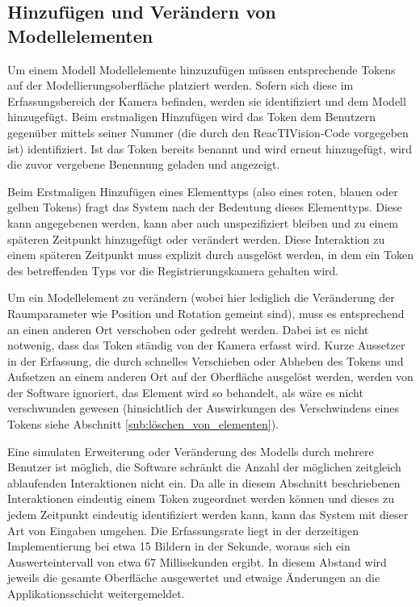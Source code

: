 \subsection{Hinzufügen und Verändern von Modellelementen} %
\label{sub:hinzufügen_und_verändern_von_modellelementen}

Um einem Modell Modellelemente hinzuzufügen müssen entsprechende Tokens auf der Modellierungsoberfläche platziert werden. Sofern sich diese im Erfassungsbereich der Kamera befinden, werden sie identifiziert und dem Modell hinzugefügt. Beim erstmaligen Hinzufügen wird das Token dem Benutzern gegenüber mittels seiner Nummer (die durch den ReacTIVision-Code vorgegeben ist) identifiziert. Ist das Token bereits benannt und wird erneut hinzugefügt, wird die zuvor vergebene Benennung geladen und angezeigt.

Beim Erstmaligen Hinzufügen eines Elementtyps (also eines roten, blauen oder gelben Tokens) fragt das System nach der Bedeutung dieses Elementtyps. Diese kann angegebenen werden, kann aber auch unspezifiziert bleiben und zu einem späteren Zeitpunkt hinzugefügt oder verändert werden. Diese Interaktion zu einem späteren Zeitpunkt muss explizit durch ausgelöst werden, in dem ein Token des betreffenden Typs vor die Registrierungskamera gehalten wird.

Um ein Modellelement zu verändern (wobei hier lediglich die Veränderung der Raumparameter wie Position und Rotation gemeint sind), muss es entsprechend an einen anderen Ort verschoben oder gedreht werden. Dabei ist es nicht notwenig, dass das Token ständig von der Kamera erfasst wird. Kurze Aussetzer in der Erfassung, die durch schnelles Verschieben oder Abheben des Tokens und Aufsetzen an einem anderen Ort auf der Oberfläche ausgelöst werden, werden von der Software ignoriert, das Element wird so behandelt, als wäre es nicht verschwunden gewesen (hinsichtlich der Auswirkungen des Verschwindens eines Tokens siehe Abschnitt \ref{sub:löschen_von_elementen}).

Eine simulaten Erweiterung oder Veränderung des Modells durch mehrere Benutzer ist möglich, die Software schränkt die Anzahl der möglichen zeitgleich ablaufenden Interaktionen nicht ein. Da alle in diesem Abschnitt beschriebenen Interaktionen eindeutig einem Token zugeordnet werden können und dieses zu jedem Zeitpunkt eindeutig identifiziert werden kann, kann das System mit dieser Art von Eingaben umgehen. Die Erfassungsrate liegt in der derzeitigen Implementierung bei etwa 15 Bildern in der Sekunde, woraus sich ein Auswerteintervall von etwa 67 Millisekunden ergibt. In diesem Abstand wird jeweils die gesamte Oberfläche ausgewertet und etwaige Änderungen an die  Applikationsschicht weitergemeldet.
 
